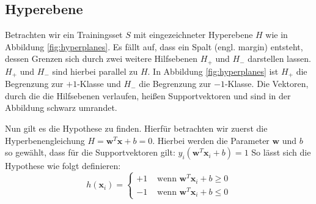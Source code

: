 \documentclass[10pt,a4paper]{scrartcl}
\begin{document}
            \subsection{Hyperebene}
                Betrachten wir ein Trainingsset $S$ mit eingezeichneter Hyperebene $H$ wie in Abbildung \ref{fig:hyperplanes}. Es fällt auf, dass ein Spalt (engl. margin) entsteht, dessen Grenzen sich durch zwei weitere Hilfsebenen $H_+$ und $H_-$ darstellen lassen. $H_+$ und $H_-$ sind hierbei parallel zu $H$. In Abbildung \ref{fig:hyperplanes} ist $H_+$ die Begrenzung zur $+1$-Klasse und $H_-$ die Begrenzung zur $-1$-Klasse. Die Vektoren, durch die die Hilfsebenen verlaufen, heißen Supportvektoren und sind in der Abbildung schwarz umrandet.
                \begin{figure}[H]
                \end{figure}
                Nun gilt es die Hypothese zu finden. Hierfür betrachten wir zuerst die Hyperbenengleichung $H = \boldsymbol{w}^T \boldsymbol{x} + b = 0$. 
                Hierbei werden die Parameter $\boldsymbol{w}$ und $b$ so gewählt, dass für die Supportvektoren gilt: $y_i ( \boldsymbol{w}^T \boldsymbol{x}_i + b ) = 1$
                So lässt sich die Hypothese wie folgt definieren:
                \begin{equation*}
                    h(\boldsymbol{x}_i) = \begin{cases}
                        +1 & \text{ wenn } \boldsymbol{w}^T \boldsymbol{x}_i + b \geq 0 \\
                        -1 & \text{ wenn } \boldsymbol{w}^T \boldsymbol{x}_i + b \leq 0
                    \end{cases}
                \end{equation*}
\end{document}
